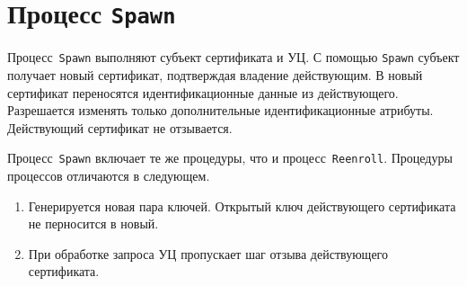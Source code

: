 \section{Процесс \texttt{Spawn}}\label{PROCESSES.Spawn}

Процесс~\texttt{Spawn} выполняют субъект сертификата и УЦ. 
С помощью \texttt{Spawn} субъект получает новый сертификат,
подтверждая владение действующим. В новый сертификат переносятся   
идентификационные данные из действующего. Разрешается изменять 
только дополнительные идентификационные атрибуты. Действующий 
сертификат не отзывается.


Процесс~\texttt{Spawn} включает те же процедуры, что и
процесс~\texttt{Reenroll}. Процедуры процессов отличаются в следующем.

\begin{enumerate}
\item
Генерируется новая пара ключей. Открытый ключ действующего сертификата
не перносится в новый.
\item
При обработке запроса УЦ пропускает шаг отзыва действующего сертификата. 
\end{enumerate}


